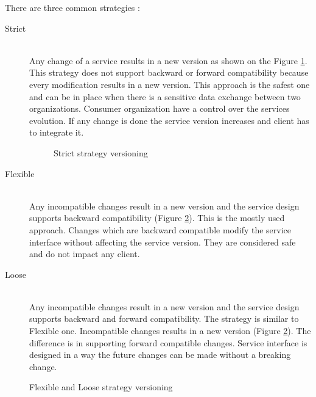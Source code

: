 There are three common strategies \cite{soa-governance}:

\begin{description}
  \item[Strict]  \hfill \\
  Any change of a service results in a new version as shown on the Figure \ref{fig:strict-strategy}. This strategy does not support backward or forward compatibility because every modification results in a new version. This approach is the safest one and can be in place when there is a sensitive data exchange between two organizations. Consumer organization have a control over the services evolution. If any change is done the service version increases and client has to integrate it. 
    
\begin{figure}[htp] 
\caption{Strict strategy versioning}
\label{fig:strict-strategy}
\end{figure} 

  \item[Flexible] \hfill \\
  Any incompatible changes result in a new version and the service design supports backward compatibility (Figure \ref{fig:flexible-strategy}). This is the mostly used approach. Changes which are backward compatible modify the service interface without affecting the service version. They are considered safe and do not impact any client.
  
  \item[Loose] \hfill \\
  Any incompatible changes result in a new version and the service design supports backward and forward compatibility. The strategy is similar to Flexible one. Incompatible changes results in a new version (Figure \ref{fig:flexible-strategy}). The difference is in supporting forward compatible changes. Service interface is designed in a way the future changes can be made without a breaking change.
\end{description}

\begin{figure}[htp] 
\caption{Flexible and Loose strategy versioning}
\label{fig:flexible-strategy}
\end{figure} 

